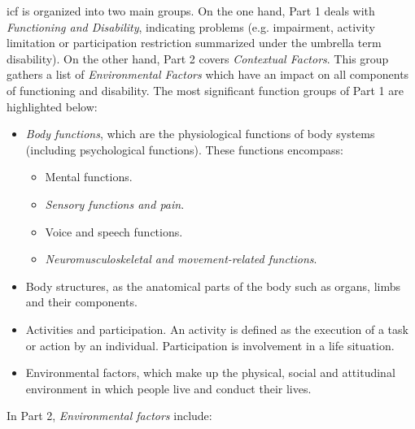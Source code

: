 \ac{icf} is organized into two main groups. On the one hand, Part 1 deals with 
\textit{Functioning and Disability}, indicating problems (e.g. impairment, 
activity limitation or participation restriction summarized under the umbrella 
term disability). On the other hand, Part 2 covers \textit{Contextual Factors}. 
This group gathers a list of \textit{Environmental Factors} which have an impact 
on all components of functioning and disability. The most significant function
groups of Part 1 are highlighted below:

\begin{itemize}
  \item \textit{Body functions}, which are the physiological functions of body 
  systems (including psychological functions). These functions encompass:
    \begin{itemize}
      \item Mental functions.
      \item \textit{Sensory functions and pain}.
      \item Voice and speech functions.
      \item \textit{Neuromusculoskeletal and movement-related functions}.
    \end{itemize}
  \item Body structures, as the anatomical parts of the body such as organs, 
  limbs and their components.
  \item Activities and participation. An activity is defined as the execution of 
  a task or action by an individual. Participation is involvement in a life 
  situation.
  \item Environmental factors, which make up the physical, social and attitudinal
  environment in which people live and conduct their lives.
\end{itemize}

In Part 2, \textit{Environmental factors} include:

